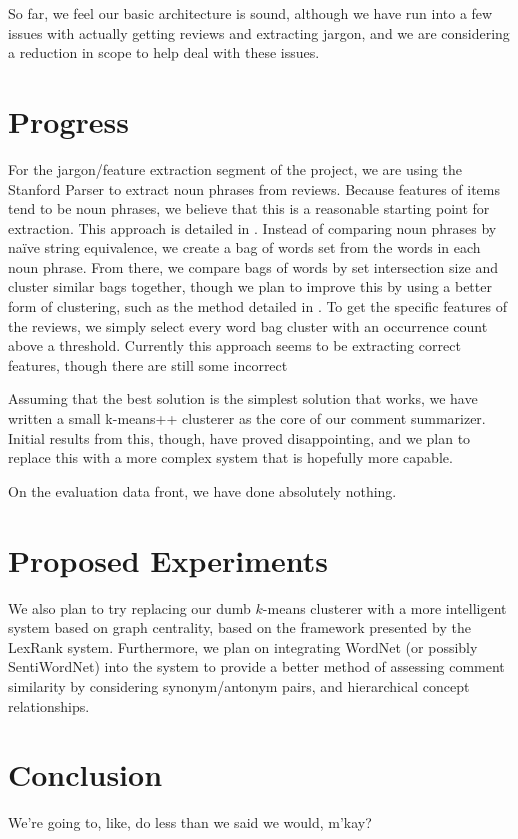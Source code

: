 \documentclass{article}
\begin{document}
So far, we feel our basic architecture is sound, although we have run into a
few issues with actually getting reviews and extracting jargon, and we are
considering a reduction in scope to help deal with these issues.

\section{Progress}
For the jargon/feature extraction segment of the project, we are using the Stanford Parser to extract noun phrases from reviews.  Because features of items tend to be noun phrases, we believe that this is a reasonable starting point for extraction.  This approach is detailed in \cite{opine}.  Instead of comparing noun phrases by na\" ive string equivalence, we create a bag of words set from the words in each noun phrase.  From there, we compare bags of words by set intersection size and cluster similar bags together, though we plan to improve this by using a better form of clustering, such as the method detailed in \cite{lexrank}.  To get the specific features of the reviews, we simply select every word bag cluster with an occurrence count above a threshold.  Currently this approach seems to be extracting correct features, though there are still some incorrect 

Assuming that the best solution is the simplest solution that works, we have written a small k-means++ clusterer as the core of our comment
summarizer. Initial results from this, though, have proved disappointing, and
we plan to replace this with a more complex system that is hopefully more
capable.

On the evaluation data front, we have done absolutely nothing.

\section{Proposed Experiments}

We also plan to try replacing our dumb $k$-means clusterer with a more intelligent
system based on graph centrality, based on the framework presented by the
LexRank system. Furthermore, we plan on integrating WordNet (or possibly
SentiWordNet) into the system to provide a better method of assessing comment
similarity by considering synonym/antonym pairs, and hierarchical concept
relationships.

\section{Conclusion}
We're going to, like, do less than we said we would, m'kay?

\tocsection


\end{document}
